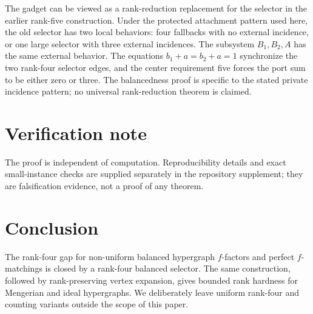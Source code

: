\documentclass[11pt]{article}
\theoremstyle{definition}
\theoremstyle{remark}
\begin{document}
The gadget can be viewed as a rank-reduction replacement for the selector in
the earlier rank-five construction. Under the protected attachment pattern
used here, the old selector has two local behaviors: four fallbacks with no
external incidence, or one large selector with three external incidences.
The subsystem $B_1,B_2,A$ has the same external behavior. The equations
$b_1+a=b_2+a=1$ synchronize the two rank-four selector edges, and the center
requirement five forces the port sum to be either zero or three. The
balancedness proof is specific to the stated private incidence pattern; no
universal rank-reduction theorem is claimed.

\section{Verification note}

The proof is independent of computation. Reproducibility details and exact
small-instance checks are supplied separately in the repository supplement;
they are falsification evidence, not a proof of any theorem.

\section{Conclusion}

The rank-four gap for non-uniform balanced hypergraph $f$-factors and
perfect $f$-matchings is closed by a rank-four balanced selector. The same
construction, followed by rank-preserving vertex expansion, gives bounded
rank hardness for Mengerian and ideal hypergraphs. We deliberately leave
uniform rank-four and counting variants outside the scope of this paper.



\end{document}

